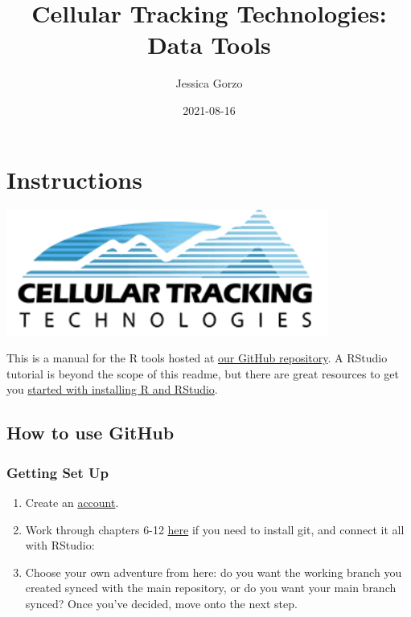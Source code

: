 \documentclass[
]{book}
\title{Cellular Tracking Technologies: Data Tools}
\author{Jessica Gorzo}
\date{2021-08-16}
\providecommand{\tightlist}{%
  \setlength{\itemsep}{0pt}\setlength{\parskip}{0pt}}
\begin{document}
\maketitle

{
\setcounter{tocdepth}{1}
\tableofcontents
}
\hypertarget{instructions}{%
\chapter*{Instructions}\label{instructions}}

\includegraphics[width=4.17in]{bookdown-demo_files/figure-html/unnamed}

This is a manual for the R tools hosted at \href{https://github.com/cellular-tracking-technologies/data_tools}{our GitHub repository}. A RStudio tutorial is beyond the scope of this readme, but there are great resources to get you \href{https://www.earthdatascience.org/courses/earth-analytics/document-your-science/setup-r-rstudio/}{started with installing R and RStudio}.

\hypertarget{how-to-use-github}{%
\section*{How to use GitHub}\label{how-to-use-github}}

\hypertarget{getting-set-up}{%
\subsection*{Getting Set Up}\label{getting-set-up}}

\begin{enumerate}
\def\labelenumi{\arabic{enumi}.}
\tightlist
\item
  Create an \href{https://github.com}{account}.
\item
  Work through chapters 6-12 \href{https://happygitwithr.com/install-git.html}{here} if you need to install git, and connect it all with RStudio:
\item
  Choose your own adventure from here: do you want the working branch you created synced with the main repository, or do you want your main branch synced? Once you've decided, move onto the next step.
\end{enumerate}
\end{document}
